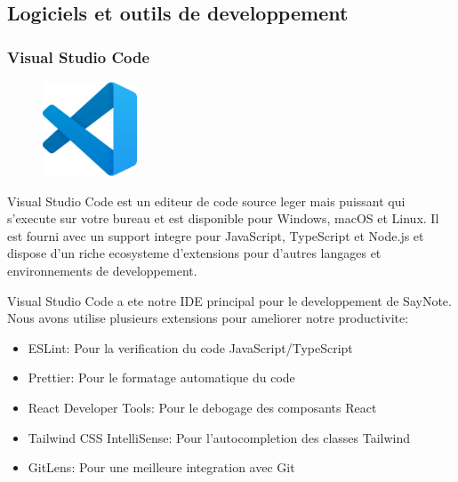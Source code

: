 \subsection{Logiciels et outils de developpement}

\subsubsection{Visual Studio Code}
\begin{figure}
    \centering
    \includegraphics[width=0.25\textwidth]{assets/docs/vscode.png}
\end{figure}
Visual Studio Code est un editeur de code source leger mais puissant qui s'execute sur votre bureau et est disponible pour Windows, macOS et Linux. Il est fourni avec un support integre pour JavaScript, TypeScript et Node.js et dispose d'un riche ecosysteme d'extensions pour d'autres langages et environnements de developpement.

Visual Studio Code a ete notre IDE principal pour le developpement de SayNote. Nous avons utilise plusieurs extensions pour ameliorer notre productivite:

\begin{itemize}
    \item ESLint: Pour la verification du code JavaScript/TypeScript
    \item Prettier: Pour le formatage automatique du code
    \item React Developer Tools: Pour le debogage des composants React
    \item Tailwind CSS IntelliSense: Pour l'autocompletion des classes Tailwind
    \item GitLens: Pour une meilleure integration avec Git
\end{itemize}

